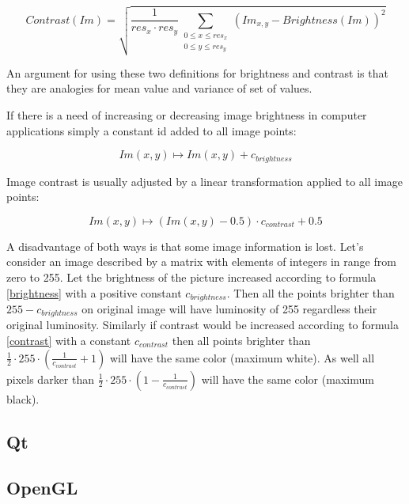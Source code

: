 \[
Contrast(Im) = \sqrt{\frac{1}{res_{x} \cdot res_{y}}\sum_{\substack{ 0 \leq x \leq res_{x} \\ 0 \leq y \leq res_{y} }}(Im_{x,y}-Brightness(Im))^2}
\]

An argument for using these two definitions for brightness and contrast is that they are analogies for mean value and variance of set of values.

If there is a need of increasing or decreasing image brightness in computer applications simply a constant id added to all image points:

\begin{equation}
\label{brightness}
  Im(x,y) \longmapsto Im(x,y) + c_{brightness} 
\end{equation}

Image contrast is usually adjusted by a linear transformation applied to all image points:

\begin{equation}
\label{contrast}
  Im(x,y) \longmapsto   (Im(x,y) - 0.5) \cdot c_{contrast} + 0.5
\end{equation}

A disadvantage of both ways is that some image information is lost. Let's consider an image described by a matrix with elements of integers in range from zero to 255. Let the brightness of the picture increased according to formula \eqref{brightness} with a positive constant $ c_{brightness} $. Then all the points brighter than $ 255 - c_{brightness} $ on original image will have luminosity of 255 regardless their original luminosity. Similarly if contrast would be increased according to formula \eqref{contrast} with a constant $ c_{contrast} $ then all points brighter than $ \frac{1}{2} \cdot 255 \cdot (\frac{1}{c_{contrast}}+1) $ will have the same color (maximum white). As well all pixels darker than $ \frac{1}{2} \cdot 255 \cdot (1 - \frac{1}{c_{contrast}}) $ will have the same color (maximum black).

\subsection{Qt}


\subsection{OpenGL}

